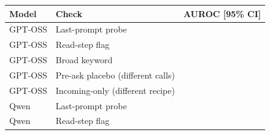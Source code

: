 \begin{tabular}{llc}
\toprule
Model & Check & AUROC [95\% CI] \\
\midrule
GPT-OSS & Last-prompt probe & \gptossCallProbe{} \gptossCallProbeCI{} \\
GPT-OSS & Read-step flag & \gptossReadStep{} \gptossReadStepCI{} \\
GPT-OSS & Broad keyword & \gptossKeyword{} \gptossKeywordCI{} \\
GPT-OSS & Pre-ask placebo (different calls) & \gptossPlacebo{} \gptossPlaceboCI{} \\
GPT-OSS & Incoming-only (different recipe) & \gptossIncomingProbe{} \gptossIncomingProbeCI{} \\
Qwen & Last-prompt probe & \qwenCallProbe{} \qwenCallProbeCI{} \\
Qwen & Read-step flag & \qwenReadStep{} \qwenReadStepCI{} \\
\bottomrule
\end{tabular}

